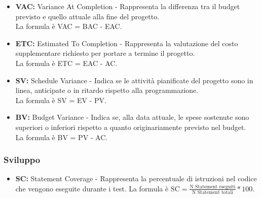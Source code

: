 \begin{itemize}
    \item \textbf{VAC:} Variance At Completion - Rappresenta la differenza tra il budget previsto e quello attuale alla fine del progetto.\\
    La formula è VAC = BAC - EAC.
    \item \textbf{ETC:} Estimated To Completion - Rappresenta la valutazione del costo supplementare richiesto per portare a termine il progetto.\\
    La formula è ETC = EAC - AC.
    \item \textbf{SV:} Schedule Variance - Indica se le attività pianificate del progetto sono in linea, anticipate o in ritardo rispetto alla programmazione.\\
    La formula è SV = EV - PV.
    \item \textbf{BV:} Budget Variance - Indica se, alla data attuale, le spese sostenute sono superiori o inferiori rispetto a quanto originariamente previsto nel budget.\\
    La formula è BV = PV - AC.
\end{itemize}
\newpage
\subsubsection{Sviluppo}
\begin{itemize}
    \item \textbf{SC:} Statement Coverage - Rappresenta la percentuale di istruzioni nel codice che vengono eseguite durante i test.
    La formula è \( \text{SC} = \frac{\text{N Statement eseguiti}}{\text{N Statement totali}}*100 \).
\end{itemize}
